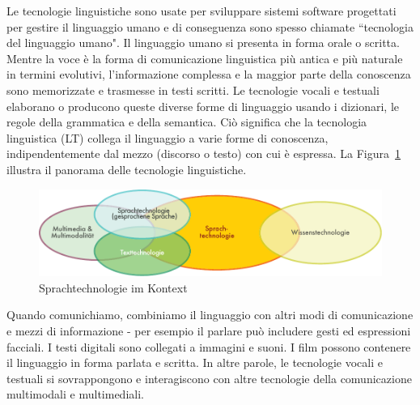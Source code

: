\documentclass[]{../../metanetpaper}
\begin{document}
\clearpage





\begin{multicols}{2}

Le tecnologie linguistiche sono usate per sviluppare sistemi software
progettati per gestire il linguaggio umano e di conseguenza sono spesso
chiamate “tecnologia del linguaggio umano". Il linguaggio umano si presenta in
forma orale o scritta. Mentre la voce \`{e} la forma di comunicazione
linguistica pi\`{u} antica e pi\`{u} naturale in termini evolutivi,
l'informazione complessa e la maggior parte della conoscenza sono memorizzate
e trasmesse in testi scritti. Le tecnologie vocali e testuali elaborano o
producono queste diverse forme di linguaggio usando i dizionari, le regole
della grammatica e della semantica. Ci\`{o} significa che la tecnologia
linguistica (LT) collega il linguaggio a varie forme di conoscenza,
indipendentemente dal mezzo (discorso o testo) con cui \`{e} espressa. La
Figura~\ref{fig:ltincontext_de} illustra il panorama delle tecnologie
linguistiche. 


\begin{figure}[htb]
  \center
  \includegraphics[width=\textwidth]{../_media/german/language_technologies}
  \caption{Sprachtechnologie im Kontext}
  \label{fig:ltincontext_de}
\end{figure}

Quando comunichiamo, combiniamo il linguaggio con altri modi di comunicazione
e mezzi di informazione - per esempio il parlare pu\`{o} includere gesti ed
espressioni facciali. I testi digitali sono collegati a immagini e suoni. I
film possono contenere il linguaggio in forma parlata e scritta. In altre
parole, le tecnologie vocali e testuali si sovrappongono e interagiscono con
altre tecnologie della comunicazione multimodali e multimediali.



\end{multicols}
\end{document}
